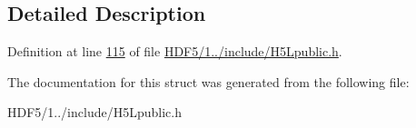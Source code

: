 \subsection{Detailed Description}


Definition at line \hyperlink{_h_d_f5_21_810_81_2include_2_h5_lpublic_8h_source_l00115}{115} of file \hyperlink{_h_d_f5_21_810_81_2include_2_h5_lpublic_8h_source}{H\+D\+F5/1../include/\+H5\+Lpublic.\+h}.



The documentation for this struct was generated from the following file\+:\begin{DoxyCompactItemize}
\item 
H\+D\+F5/1../include/\+H5\+Lpublic.\+h\end{DoxyCompactItemize}
